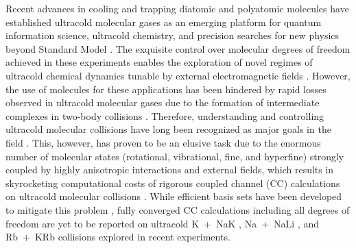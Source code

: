 \documentclass[reprint,amssymb,noeprint,twocolumn,longbibliography]{revtex4-2}
\begin{document}
Recent advances in cooling and trapping diatomic and polyatomic molecules have established ultracold molecular gases as an emerging platform for quantum information science, ultracold chemistry, and precision searches for new physics beyond Standard Model \cite{Carr_09,Balakrishnan:16,Bohn_17,Demille_17}.
The exquisite control over molecular degrees of freedom achieved in these experiments enables the exploration of novel regimes of ultracold chemical dynamics tunable by external electromagnetic fields \cite{Lemeshko_13,Krems_09,Dulieu_17}. 
However, the use of molecules for these applications has been hindered by rapid losses observed in ultracold molecular gases due to the formation of intermediate complexes in two-body collisions \cite{Mayle_12,Mayle_13,Christianen_19,Gregory_19,Liu_20,Gersema_21,Nichols_22,Bause_23}.
Therefore, understanding and controlling ultracold molecular collisions have long been recognized as major goals in the field \cite{Carr_09,Bohn_17}.
This, however, has proven to be an elusive task due to the enormous number of molecular states (rotational, vibrational, fine, and hyperfine) strongly coupled by highly anisotropic interactions and external fields, which results in skyrocketing computational costs of rigorous coupled channel (CC) calculations on ultracold molecular collisions \cite{Morita_19,Morita_20}. 
While efficient basis sets have been developed to mitigate this problem \cite{Tscherbul_10,Suleimanov_12,Morita_18,Morita_20,Tscherbul_23}, fully converged CC calculations including all degrees of freedom are yet to be reported on ultracold K~+~NaK \cite{Yang_19,Wang_21},  Na~+~NaLi \cite{Son_22,Park:23b}, and Rb~+~KRb \cite{Nichols_22} collisions explored in recent experiments.  

\end{document}
